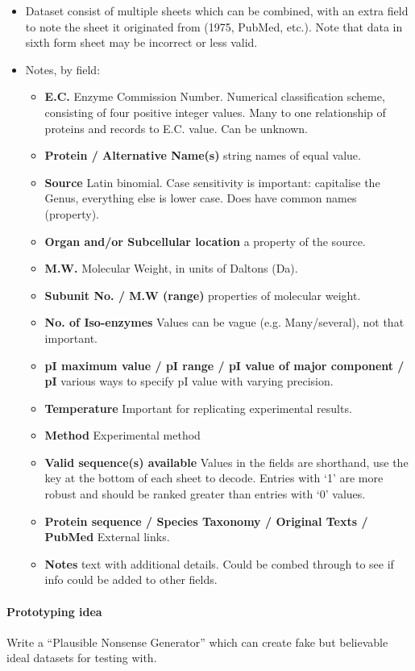 \begin{itemize}
\item Dataset consist of multiple sheets which can be combined, with an extra
  field to note the sheet it originated from (1975, PubMed, etc.). Note that
  data in sixth form sheet may be incorrect or less valid.
\item Notes, by field:
  \begin{itemize}
  \item \textbf{E.C.} Enzyme Commission Number. Numerical classification scheme,
    consisting of four positive integer values. Many to one relationship of
    proteins and records to E.C. value. Can be unknown.
  \item \textbf{Protein / Alternative Name(s)} string names of equal value.
  \item \textbf{Source} Latin binomial. Case sensitivity is important:
    capitalise the Genus, everything else is lower case. Does have common names
    (property).
  \item \textbf{Organ and/or Subcellular location} a property of the source.
  \item \textbf{M.W.} Molecular Weight, in units of Daltons (Da).
  \item \textbf{Subunit No. / M.W (range)} properties of molecular weight.
  \item \textbf{No. of Iso-enzymes} Values can be vague (e.g. Many/several), not
    that important.
  \item \textbf{pI maximum value / pI range / pI value of major component / pI}
    various ways to specify pI value with varying precision.
  \item \textbf{Temperature} Important for replicating experimental results.
  \item \textbf{Method} Experimental method
  \item \textbf{Valid sequence(s) available} Values in the fields are shorthand,
    use the key at the bottom of each sheet to decode. Entries with ‘1’ are more
    robust and should be ranked greater than entries with ‘0’ values.
  \item \textbf{Protein sequence / Species Taxonomy / Original Texts / PubMed}
    External links.
  \item \textbf{Notes} text with additional details. Could be combed through to
    see if info could be added to other fields.
  \end{itemize}
\end{itemize}

\paragraph{Prototyping idea} Write a ``Plausible Nonsense Generator'' which can
create fake but believable ideal datasets for testing with.

